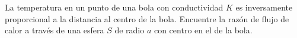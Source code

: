 \item La temperatura en un punto de una bola con conductividad $K$ es inversamente proporcional a la distancia al centro de la bola. Encuentre la razón de flujo de calor a través de una esfera $S$ de radio $a$ con centro en el de la bola.
